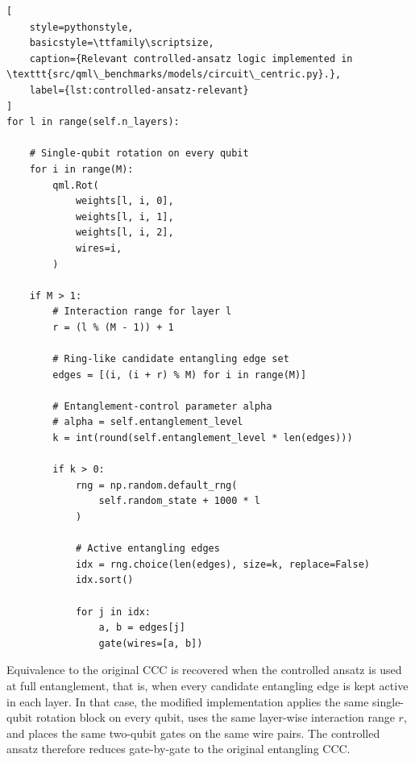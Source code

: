 \documentclass[12pt,a4paper,openany]{report}
\begin{document}
\begin{lstlisting}[
    style=pythonstyle,
    basicstyle=\ttfamily\scriptsize,
    caption={Relevant controlled-ansatz logic implemented in \texttt{src/qml\_benchmarks/models/circuit\_centric.py}.},
    label={lst:controlled-ansatz-relevant}
]
for l in range(self.n_layers):

    # Single-qubit rotation on every qubit
    for i in range(M):
        qml.Rot(
            weights[l, i, 0],
            weights[l, i, 1],
            weights[l, i, 2],
            wires=i,
        )

    if M > 1:
        # Interaction range for layer l
        r = (l % (M - 1)) + 1

        # Ring-like candidate entangling edge set
        edges = [(i, (i + r) % M) for i in range(M)]

        # Entanglement-control parameter alpha
        # alpha = self.entanglement_level
        k = int(round(self.entanglement_level * len(edges)))

        if k > 0:
            rng = np.random.default_rng(
                self.random_state + 1000 * l
            )

            # Active entangling edges
            idx = rng.choice(len(edges), size=k, replace=False)
            idx.sort()

            for j in idx:
                a, b = edges[j]
                gate(wires=[a, b])
\end{lstlisting}

Equivalence to the original CCC is recovered when the controlled ansatz is used at full entanglement, that is, when every candidate entangling edge is kept active in each layer. In that case, the modified implementation applies the same single-qubit rotation block on every qubit, uses the same layer-wise interaction range \(r\), and places the same two-qubit gates on the same wire pairs. The controlled ansatz therefore reduces gate-by-gate to the original entangling CCC.
\end{document}
